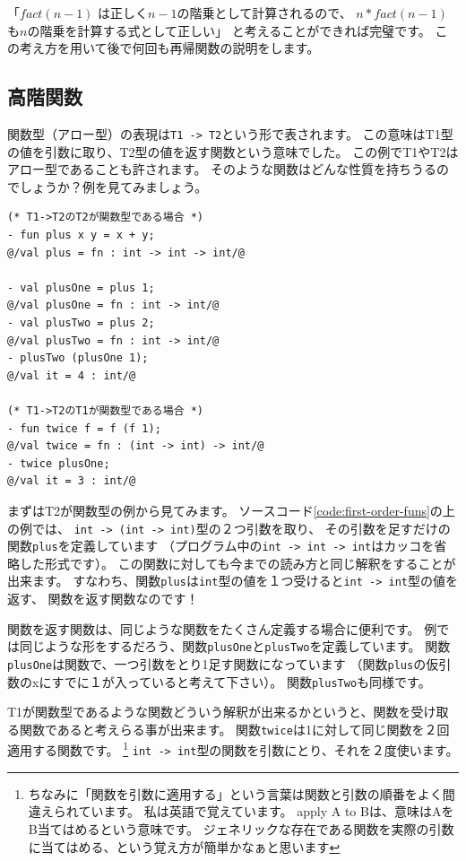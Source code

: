 \documentclass[11pt,a4paper]{article}
\begin{document}
「$fact (n - 1)$ は正しく$n - 1$の階乗として計算されるので、
$n * fact (n - 1)$も$n$の階乗を計算する式として正しい」
と考えることができれば完璧です。
この考え方を用いて後で何回も再帰関数の説明をします。

\subsection{高階関数}
関数型（アロー型）の表現は\lstinline{T1 -> T2}という形で表されます。
この意味はT1型の値を引数に取り、T2型の値を返す関数という意味でした。
この例でT1やT2はアロー型であることも許されます。
そのような関数はどんな性質を持ちうるのでしょうか？例を見てみましょう。

\begin{lstlisting}[caption=第一級関数,label=code:first-order-funs]
(* T1->T2のT2が関数型である場合 *)
- fun plus x y = x + y;
@/val plus = fn : int -> int -> int/@

- val plusOne = plus 1;
@/val plusOne = fn : int -> int/@
- val plusTwo = plus 2;
@/val plusTwo = fn : int -> int/@
- plusTwo (plusOne 1);
@/val it = 4 : int/@

(* T1->T2のT1が関数型である場合 *)
- fun twice f = f (f 1);
@/val twice = fn : (int -> int) -> int/@
- twice plusOne;
@/val it = 3 : int/@
\end{lstlisting}

まずはT2が関数型の例から見てみます。
ソースコード\ref{code:first-order-funs}の上の例では、
\lstinline{int -> (int -> int)}型の２つ引数を取り、
その引数を足すだけの関数\lstinline{plus}を定義しています
（プログラム中の\lstinline{int -> int -> int}はカッコを省略した形式です）。
この関数に対しても今までの読み方と同じ解釈をすることが出来ます。
すなわち、関数\lstinline{plus}は\lstinline{int}型の値を１つ受けると\lstinline{int -> int}型の値を返す、
関数を返す関数なのです！

関数を返す関数は、同じような関数をたくさん定義する場合に便利です。
例では同じような形をするだろう、関数\lstinline{plusOne}と\lstinline{plusTwo}を定義しています。
関数\lstinline{plusOne}は関数で、一つ引数をとり1足す関数になっています
（関数\lstinline{plus}の仮引数のxにすでに１が入っていると考えて下さい）。
関数\lstinline{plusTwo}も同様です。

T1が関数型であるような関数どういう解釈が出来るかというと、関数を受け取る関数であると考えらる事が出来ます。
関数\lstinline{twice}は1に対して同じ関数を２回適用する関数です。
\footnote{
ちなみに「関数を引数に適用する」という言葉は関数と引数の順番をよく間違えられています。
私は英語で覚えています。
apply A to Bは、意味はAをB当てはめるという意味です。
ジェネリックな存在である関数を実際の引数に当てはめる、という覚え方が簡単かなぁと思います}
\lstinline{int -> int}型の関数を引数にとり、それを２度使います。
\end{document}
